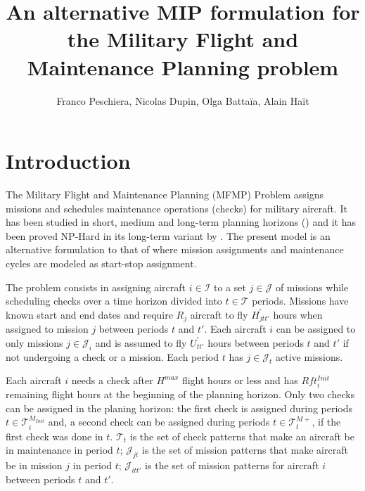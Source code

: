 \documentclass{roadef}
\begin{document}
\title{An alternative MIP formulation for the Military Flight and Maintenance Planning problem}

\author{Franco Peschiera, Nicolas Dupin, Olga Batta{\"i}a, Alain Ha{\"i}t}



\maketitle
\thispagestyle{empty}


\section{Introduction}
    The Military Flight and Maintenance Planning (MFMP) Problem assigns missions and schedules maintenance operations (checks) for military aircraft. It has been studied in short, medium and long-term planning horizons (\cite{Cho2011,Kozanidis2008,Verhoeff2015,PeschieraR2018}) and it has been proved NP-Hard in its long-term variant by \cite{Peschiera2019}. The present model is an alternative formulation to that of \cite{Peschiera2019} where mission assignments and maintenance cycles are modeled as start-stop assignment.

    The problem consists in assigning aircraft $i \in \mathcal{I}$ to a set $j \in \mathcal{J}$ of missions while scheduling checks over a time horizon divided into $t \in \mathcal{T}$ periods. Missions have known start and end dates and require $R_j$ aircraft to fly $H^\prime_{jtt'}$ hours when assigned to mission $j$ between periods $t$ and $t'$. Each aircraft $i$ can be assigned to only missions $j \in \mathcal{J}_i$ and is assumed to fly $U^{\prime}_{tt'}$ hours between periods $t$ and $t'$ if not undergoing a check or a mission. Each period $t$ has $j \in \mathcal{J}_t$ active missions.

    Each aircraft $i$ needs a check after $H^{max}$ flight hours or less and has $Rft^{Init}_i$ remaining flight hours at the beginning of the planning horizon. Only two checks can be assigned in the planing horizon: the first check is assigned during periods $t \in \mathcal{T}^{M_{Init}}_i$ and, a second check can be assigned during periods $t \in \mathcal{T}^{M+}_{t}$, if the first check was done in $t$. $\mathcal{T}_t$ is the set of check patterns that make an aircraft be in maintenance in period $t$; $\mathcal{J}_{jt}$ is the set of mission patterns that make aircraft be in mission $j$ in period $t$; $\mathcal{J}_{itt'}$ is the set of mission patterns for aircraft $i$ between periods $t$ and $t'$.
\end{document}
